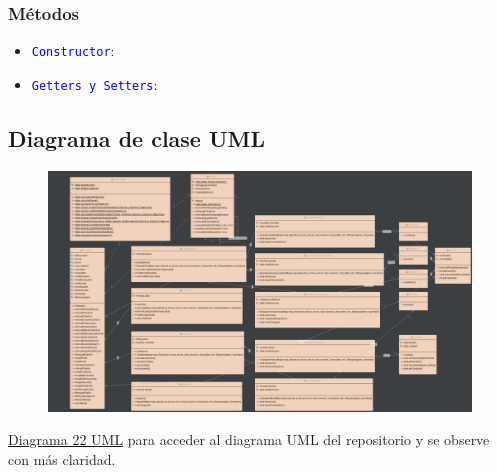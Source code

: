 \documentclass{article}
\begin{document}
\subsubsection{Métodos}
\begin{itemize}
    \item \texttt{\textcolor{blue}{Constructor}}: 
\end{itemize}

\begin{itemize}
    \item \texttt{\textcolor{blue}{Getters y Setters}}: 
\end{itemize}







\newpage

\subsection{Diagrama de clase UML}
\begin{figure}[H]
    \centering
    \includegraphics[width=1.1
    \textwidth,keepaspectratio]{img/22uml.png}
    \caption{}
\end{figure}

\href{https://github.com/hernanchoquehuanca/fp2-23b/blob/main/fase03/lab22/latex/img/22uml.png}{Diagrama 22 UML} para acceder al diagrama UML del repositorio y se observe con más claridad.

\end{document}
